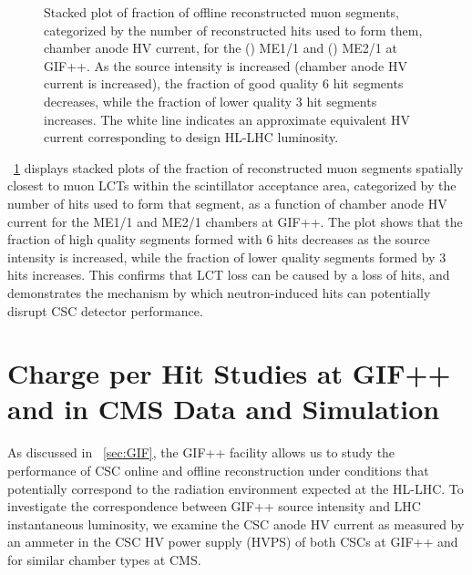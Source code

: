 \begin{figure}[htbp]
  \caption[Stacked plot of fraction of offline reconstructed muon segments, categorized by the number of reconstructed hits used to form them, for the ME1/1 and ME2/1 at GIF++.]{Stacked plot of fraction of offline reconstructed muon segments, categorized by the number of reconstructed hits used to form them, \vs chamber anode HV current, for the () ME1/1 and () ME2/1 at GIF++. As the source intensity is increased (chamber anode HV current is increased), the fraction of good quality 6 hit segments decreases, while the fraction of lower quality 3 hit segments increases. The white line indicates an approximate equivalent HV current corresponding to design HL-LHC luminosity.}
	\label{fig:seg_frac}
\end{figure}

\Fig~\ref{fig:seg_frac} displays stacked plots of the fraction of reconstructed muon segments spatially closest to muon LCTs within the scintillator acceptance area, categorized by the number of hits used to form that segment, as a function of chamber anode HV current for the ME1/1 and ME2/1 chambers at GIF++. The plot shows that the fraction of high quality segments formed with 6 hits decreases as the source intensity is increased, while the fraction of lower quality segments formed by 3 hits increases. This confirms that LCT loss can be caused by a loss of hits, and demonstrates the mechanism by which neutron-induced hits can potentially disrupt CSC detector performance.

\section{Charge per Hit Studies at GIF++ and in CMS Data and Simulation}
\label{sec:chargeperhit}

As discussed in \Sec~\ref{sec:GIF}, the GIF++ facility allows us to study the performance of CSC online and offline reconstruction under conditions that potentially correspond to the radiation environment expected at the HL-LHC. To investigate the correspondence between GIF++ source intensity and LHC instantaneous luminosity, we examine the CSC anode HV current as measured by an ammeter in the CSC HV power supply (HVPS) of both CSCs at GIF++ and for similar chamber types at CMS.

